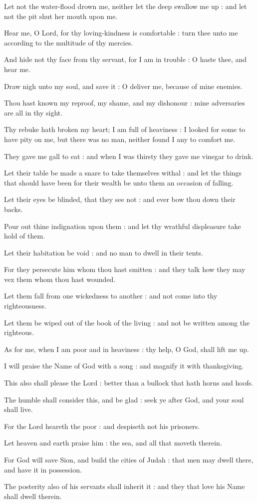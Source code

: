 Let not the water-flood drown me, neither let the deep swallow me up : and let not the pit shut her mouth upon me.\par
{}Hear me, O Lord, for thy loving-kindness is comfortable : turn thee unto me according to the multitude of thy mercies.\par
{}And hide not thy face from thy servant, for I am in trouble : O haste thee, and hear me.\par
{}Draw nigh unto my soul, and save it : O deliver me, because of mine enemies.\par
{}Thou hast known my reproof, my shame, and my dishonour : mine adversaries are all in thy sight.\par
{}Thy rebuke hath broken my heart; I am full of heaviness : I looked for some to have pity on me, but there was no man, neither found I any to comfort me.\par
{}They gave me gall to eat : and when I was thirsty they gave me vinegar to drink.\par
{}Let their table be made a snare to take themselves withal : and let the things that should have been for their wealth be unto them an occasion of falling.\par
{}Let their eyes be blinded, that they see not : and ever bow thou down their backs.\par
{}Pour out thine indignation upon them : and let thy wrathful displeasure take hold of them.\par
{}Let their habitation be void : and no man to dwell in their tents.\par
{}For they persecute him whom thou hast smitten : and they talk how they may vex them whom thou hast wounded.\par
{}Let them fall from one wickedness to another : and not come into thy righteousness.\par
{}Let them be wiped out of the book of the living : and not be written among the righteous.\par
{}As for me, when I am poor and in heaviness : thy help, O God, shall lift me up.\par
{}I will praise the Name of God with a song : and magnify it with thanksgiving.\par
{}This also shall please the Lord : better than a bullock that hath horns and hoofs.\par
{}The humble shall consider this, and be glad : seek ye after God, and your soul shall live.\par
{}For the Lord heareth the poor : and despiseth not his prisoners.\par
{}Let heaven and earth praise him : the sea, and all that moveth therein.\par
{}For God will save Sion, and build the cities of Judah : that men may dwell there, and have it in possession.\par
{}The posterity also of his servants shall inherit it : and they that love his Name shall dwell therein.\par

